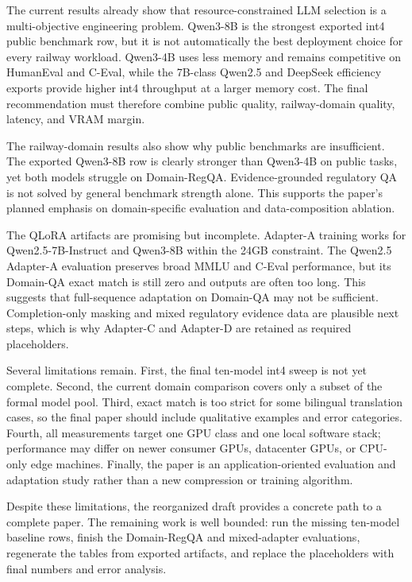 \label{sec:discussion}

The current results already show that resource-constrained LLM selection is a
multi-objective engineering problem. Qwen3-8B is the strongest exported int4
public benchmark row, but it is not automatically the best deployment choice
for every railway workload. Qwen3-4B uses less memory and remains competitive
on HumanEval and C-Eval, while the 7B-class Qwen2.5 and DeepSeek efficiency
exports provide higher int4 throughput at a larger memory cost. The final
recommendation must therefore combine public quality, railway-domain quality,
latency, and VRAM margin.

The railway-domain results also show why public benchmarks are insufficient.
The exported Qwen3-8B row is clearly stronger than Qwen3-4B on public tasks,
yet both models struggle on Domain-RegQA. Evidence-grounded regulatory QA is
not solved by general benchmark strength alone. This supports the paper's
planned emphasis on domain-specific evaluation and data-composition ablation.

The QLoRA artifacts are promising but incomplete. Adapter-A training works for
Qwen2.5-7B-Instruct and Qwen3-8B within the 24GB constraint. The Qwen2.5
Adapter-A evaluation preserves broad MMLU and C-Eval performance, but its
Domain-QA exact match is still zero and outputs are often too long. This
suggests that full-sequence adaptation on Domain-QA may not be sufficient.
Completion-only masking and mixed regulatory evidence data are plausible next
steps, which is why Adapter-C and Adapter-D are retained as required
placeholders.

Several limitations remain. First, the final ten-model int4 sweep is not yet
complete. Second, the current domain comparison covers only a subset of the
formal model pool. Third, exact match is too strict for some bilingual
translation cases, so the final paper should include qualitative examples and
error categories. Fourth, all measurements target one GPU class and one local
software stack; performance may differ on newer consumer GPUs, datacenter GPUs,
or CPU-only edge machines. Finally, the paper is an application-oriented
evaluation and adaptation study rather than a new compression or training
algorithm.

Despite these limitations, the reorganized draft provides a concrete path to a
complete paper. The remaining work is well bounded: run the missing ten-model
baseline rows, finish the Domain-RegQA and mixed-adapter evaluations, regenerate
the tables from exported artifacts, and replace the placeholders with final
numbers and error analysis.
